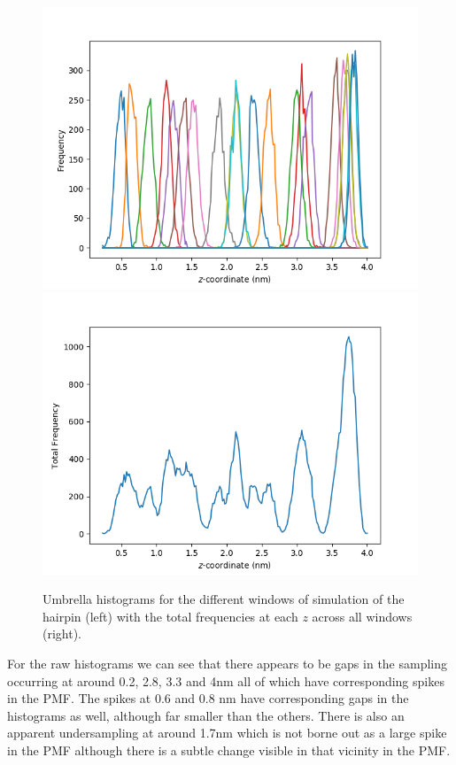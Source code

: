 \documentclass[12pt, onecolumn]{revtex4}    %
\begin{document}
\begin{figure}[h!]
\includegraphics[scale=0.4]{HairUMBs}
\includegraphics[scale=0.4]{HairUmbSums}
\label{fig: hairhists}
\caption{Umbrella histograms for the different windows of simulation of the hairpin (left) with the total frequencies at each $z$ across all windows (right).}
\end{figure}

For the raw histograms we can see that there appears to be gaps in the sampling occurring at around 0.2, 2.8, 3.3 and 4nm all of which have corresponding spikes in the PMF.  The spikes at 0.6 and 0.8 nm have corresponding gaps in the histograms as well, although far smaller than the others.  There is also an apparent undersampling at around 1.7nm which is not borne out as a large spike in the PMF although there is a subtle change visible in that vicinity in the PMF.\\
\end{document}
